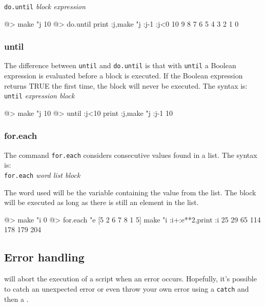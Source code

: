{\tt do.until} {\it block expression}\\ 

\begin{verbatimtab}
@> make "j 10 
@> do.until {print :j,make "j :j-1} :j<0
10
9
8
7
6
5
4
3
2
1	
0
\end{verbatimtab} 
 
\subsubsection*{until} 
 
The difference between {\tt until} and {\tt do.until} is that with {\tt until} a Boolean expression is evaluated before a block is executed.  If the Boolean
expression returns TRUE the first time, the block will never be
executed. The syntax is:\\
 
{\tt until} {\it expression block}\\  
 
\begin{verbatimtab} 
@> make "j 10
@> until :j<10 {print :j,make "j :j-1}
10
\end{verbatimtab}
 
\subsubsection*{for.each} 

The command {\tt for.each} considers consecutive values found in a
list. The syntax is: \\ 
 
{\tt for.each} {\it word list block}  
 
The word used will be the variable containing the value from the list.  The block will be executed as long as there is still an element in the list. 
 
\begin{verbatimtab}
@> make "i 0
@> for.each "e [5 2 6 7 8 1 5] {make "i :i+:e**2,print :i}
25
29
65
114
178
179
204	
\end{verbatimtab}
 
\subsection{Error handling} 
 
\squirrel will abort the execution of a script when an error occurs. Hopefully, it's possible to catch an unexpected error 
or even throw your own error using a {\tt catch} and then a {\tt {}}. 
 
